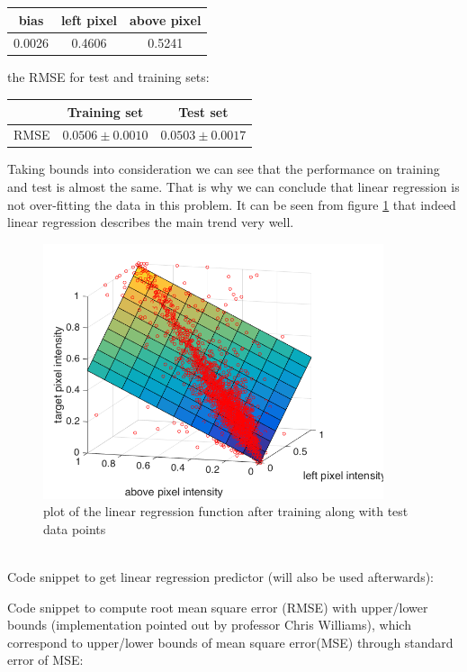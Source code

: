 \documentclass{article}
\begin{document}
\begin{enumerate}[label=(\alph*)]
\begin{center}
						\begin{tabular}{| c | c | c |}
							\hline
							bias & left pixel & above pixel \\ \hline
							0.0026  & 0.4606 & 0.5241 \\ 
							\hline
						\end{tabular}
					\end{center}					
					the RMSE for test and training sets:
					\begin{center}
						\begin{tabular}{| c | c | c |}
							\hline
							\, & Training set & Test set \\ \hline
							RMSE  & $0.0506 \pm 0.0010$ & $0.0503 \pm 0.0017$ \\ 
							\hline
						\end{tabular}
					\end{center}
					Taking bounds into consideration we can see that the performance on training and test is almost the same. That is why we can conclude that linear regression is not over-fitting the data in this problem. It can be seen from figure \ref{fig:p1-2-c} that indeed linear regression describes the main trend very well. \\
				 	\begin{figure}[htbp]
				 		\centering
				 		\includegraphics[width=10cm]{images/p1-2-c}
				 		\caption{plot of the linear regression function after training along with test data points}
				 		\label{fig:p1-2-c}
				 	\end{figure}
				 	\\
					Code snippet to get linear regression predictor (will also be used afterwards):
					 
					Code snippet to compute root mean square error (RMSE) with upper/lower bounds (implementation pointed out by professor Chris Williams), which correspond to upper/lower bounds of mean square error(MSE) through standard error of MSE:

\end{enumerate}
\end{document}
